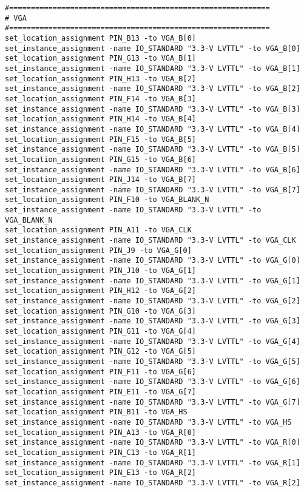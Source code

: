 \begin{verbatim}
#============================================================
# VGA
#============================================================
set_location_assignment PIN_B13 -to VGA_B[0]
set_instance_assignment -name IO_STANDARD "3.3-V LVTTL" -to VGA_B[0]
set_location_assignment PIN_G13 -to VGA_B[1]
set_instance_assignment -name IO_STANDARD "3.3-V LVTTL" -to VGA_B[1]
set_location_assignment PIN_H13 -to VGA_B[2]
set_instance_assignment -name IO_STANDARD "3.3-V LVTTL" -to VGA_B[2]
set_location_assignment PIN_F14 -to VGA_B[3]
set_instance_assignment -name IO_STANDARD "3.3-V LVTTL" -to VGA_B[3]
set_location_assignment PIN_H14 -to VGA_B[4]
set_instance_assignment -name IO_STANDARD "3.3-V LVTTL" -to VGA_B[4]
set_location_assignment PIN_F15 -to VGA_B[5]
set_instance_assignment -name IO_STANDARD "3.3-V LVTTL" -to VGA_B[5]
set_location_assignment PIN_G15 -to VGA_B[6]
set_instance_assignment -name IO_STANDARD "3.3-V LVTTL" -to VGA_B[6]
set_location_assignment PIN_J14 -to VGA_B[7]
set_instance_assignment -name IO_STANDARD "3.3-V LVTTL" -to VGA_B[7]
set_location_assignment PIN_F10 -to VGA_BLANK_N
set_instance_assignment -name IO_STANDARD "3.3-V LVTTL" -to VGA_BLANK_N
set_location_assignment PIN_A11 -to VGA_CLK
set_instance_assignment -name IO_STANDARD "3.3-V LVTTL" -to VGA_CLK
set_location_assignment PIN_J9 -to VGA_G[0]
set_instance_assignment -name IO_STANDARD "3.3-V LVTTL" -to VGA_G[0]
set_location_assignment PIN_J10 -to VGA_G[1]
set_instance_assignment -name IO_STANDARD "3.3-V LVTTL" -to VGA_G[1]
set_location_assignment PIN_H12 -to VGA_G[2]
set_instance_assignment -name IO_STANDARD "3.3-V LVTTL" -to VGA_G[2]
set_location_assignment PIN_G10 -to VGA_G[3]
set_instance_assignment -name IO_STANDARD "3.3-V LVTTL" -to VGA_G[3]
set_location_assignment PIN_G11 -to VGA_G[4]
set_instance_assignment -name IO_STANDARD "3.3-V LVTTL" -to VGA_G[4]
set_location_assignment PIN_G12 -to VGA_G[5]
set_instance_assignment -name IO_STANDARD "3.3-V LVTTL" -to VGA_G[5]
set_location_assignment PIN_F11 -to VGA_G[6]
set_instance_assignment -name IO_STANDARD "3.3-V LVTTL" -to VGA_G[6]
set_location_assignment PIN_E11 -to VGA_G[7]
set_instance_assignment -name IO_STANDARD "3.3-V LVTTL" -to VGA_G[7]
set_location_assignment PIN_B11 -to VGA_HS
set_instance_assignment -name IO_STANDARD "3.3-V LVTTL" -to VGA_HS
set_location_assignment PIN_A13 -to VGA_R[0]
set_instance_assignment -name IO_STANDARD "3.3-V LVTTL" -to VGA_R[0]
set_location_assignment PIN_C13 -to VGA_R[1]
set_instance_assignment -name IO_STANDARD "3.3-V LVTTL" -to VGA_R[1]
set_location_assignment PIN_E13 -to VGA_R[2]
set_instance_assignment -name IO_STANDARD "3.3-V LVTTL" -to VGA_R[2]

\end{verbatim}

